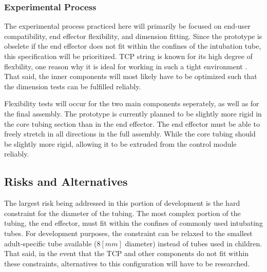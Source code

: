 	\subsubsection{Experimental Process}
	
		The experimental process practiced here will primarily be focused on end-user compatibility, end effector flexibility, and dimension fitting. Since the prototype is obselete if the end effector does not fit within the confines of the intubation tube, this specification will be prioritized. TCP string is known for its high degree of flexbility, one reason why it is ideal for working in such a tight environment \cite{haines_new_2016}. That said, the inner components will most likely have to be optimized such that the dimension tests can be fulfilled reliably.
		
		Flexibility tests will occur for the two main components seperately, as well as for the final assembly. The prototype is currently planned to be slightly more rigid in the core tubing section than in the end effector. The end effector must be able to freely stretch in all directions in the full assembly. While the core tubing should be slightly more rigid, allowing it to be extruded from the control module reliably.

\subsection{Risks and Alternatives}

	The largest risk being addressed in this portion of development is the hard constraint for the diameter of the tubing. The most complex portion of the tubing, the end effector, must fit within the confines of commonly used intubating tubes. For development purposes, the constraint can be relaxed to the smallest adult-specific tube available ($8[mm]$ diameter) instead of tubes used in children. That said, in the event that the TCP and other components do not fit within these constraints, alternatives to this configuration will have to be researched.